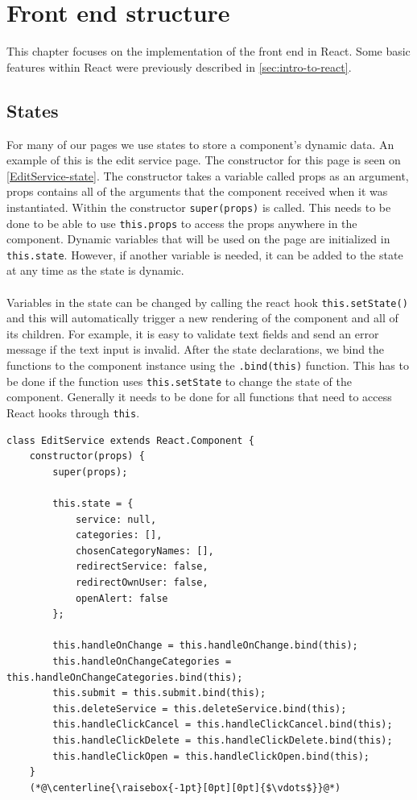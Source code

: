\section{Front end structure}
This chapter focuses on the implementation of the front end in React.
Some basic features within React were previously described in \autoref{sec:intro-to-react}.

\subsection{States}
For many of our pages we use states to store a component's dynamic data. 
An example of this is the edit service page. 
The constructor for this page is seen on \autoref{EditService-state}.
The constructor takes a variable called props as an argument, props contains all of the arguments that the component received when it was instantiated. 
Within the constructor \texttt{super(props)} is called.
This needs to be done to be able to use \texttt{this.props} to access the props anywhere in the component.
Dynamic variables that will be used on the page are initialized in \texttt{this.state}. 
However, if another variable is needed, it can be added to the state at any time as the state is dynamic.\\\\
Variables in the state can be changed by calling the react hook \texttt{this.setState()} and this will automatically trigger a new rendering of the component and all of its children.
For example, it is easy to validate text fields and send an error message if the text input is invalid.  
After the state declarations, we bind the functions to the component instance using the \texttt{.bind(this)} function.
This has to be done if the function uses \texttt{this.setState} to change the state of the component.
Generally it needs to be done for all functions that need to access React hooks through \texttt{this}.
\begin{lstlisting}[caption={Constructor and state for edit service}, captionpos=b, label={EditService-state}]
class EditService extends React.Component {
    constructor(props) {
        super(props);
    
        this.state = {
            service: null,
            categories: [],
            chosenCategoryNames: [],
            redirectService: false,
            redirectOwnUser: false,
            openAlert: false
        };
            
        this.handleOnChange = this.handleOnChange.bind(this);
        this.handleOnChangeCategories = this.handleOnChangeCategories.bind(this);
        this.submit = this.submit.bind(this);
        this.deleteService = this.deleteService.bind(this);
        this.handleClickCancel = this.handleClickCancel.bind(this);
        this.handleClickDelete = this.handleClickDelete.bind(this);
        this.handleClickOpen = this.handleClickOpen.bind(this);
    }
    (*@\centerline{\raisebox{-1pt}[0pt][0pt]{$\vdots$}}@*)
\end{lstlisting}

